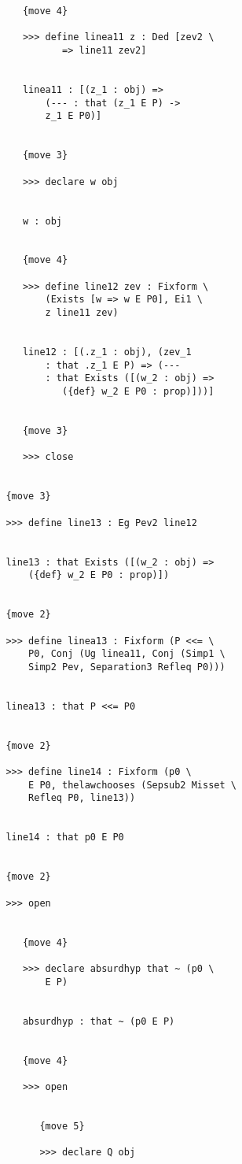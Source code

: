 \documentclass[12pt]{article}
\begin{document}
\begin{verbatim}
            {move 4}

            >>> define linea11 z : Ded [zev2 \
                   => line11 zev2]


            linea11 : [(z_1 : obj) => 
                (--- : that (z_1 E P) -> 
                z_1 E P0)]


            {move 3}

            >>> declare w obj


            w : obj


            {move 4}

            >>> define line12 zev : Fixform \
                (Exists [w => w E P0], Ei1 \
                z line11 zev)


            line12 : [(.z_1 : obj), (zev_1 
                : that .z_1 E P) => (--- 
                : that Exists ([(w_2 : obj) => 
                   ({def} w_2 E P0 : prop)]))]


            {move 3}

            >>> close


         {move 3}

         >>> define line13 : Eg Pev2 line12


         line13 : that Exists ([(w_2 : obj) => 
             ({def} w_2 E P0 : prop)])


         {move 2}

         >>> define linea13 : Fixform (P <<= \
             P0, Conj (Ug linea11, Conj (Simp1 \
             Simp2 Pev, Separation3 Refleq P0)))


         linea13 : that P <<= P0


         {move 2}

         >>> define line14 : Fixform (p0 \
             E P0, thelawchooses (Sepsub2 Misset \
             Refleq P0, line13))


         line14 : that p0 E P0


         {move 2}

         >>> open


            {move 4}

            >>> declare absurdhyp that ~ (p0 \
                E P)


            absurdhyp : that ~ (p0 E P)


            {move 4}

            >>> open


               {move 5}

               >>> declare Q obj



\end{verbatim}
\end{document}
